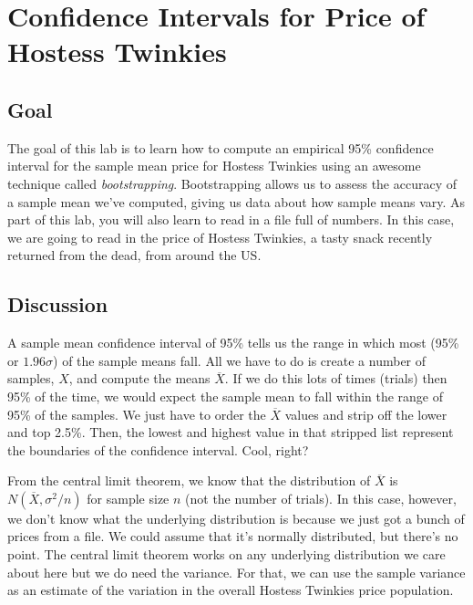 \chapter{Confidence Intervals for Price of Hostess Twinkies}

\setcounter{problem}{1}
\section{Goal}

\begin{fullwidth}


The goal of this lab is to learn how to compute an empirical 95\% confidence interval for the sample mean price for Hostess Twinkies using an awesome technique called {\em bootstrapping}. Bootstrapping allows us to assess the accuracy of a sample mean we've computed, giving us data about how sample means vary. As part of this lab, you will also learn to read in a file full of numbers. In this case, we are going to read in the price of Hostess Twinkies, a tasty snack recently returned from the dead, from around the US.

\section{Discussion}

A sample mean confidence interval of 95\% tells us the range in which most (95\% or $1.96\sigma$) of the sample means fall.  All we have to do is create a number of samples, $X$, and compute the means $\overline{X}$.  If we do this lots of times (trials) then 95\% of the time, we would expect the sample mean to fall within the range of 95\% of the samples. We just have to order the $\overline{X}$ values and strip off the lower and top 2.5\%. Then, the lowest and highest value in that stripped list represent the boundaries of the confidence interval. Cool, right?

From the central limit theorem, we know that the distribution of $\overline{X}$ is $N(\overline{X}, \sigma^2/n)$ for sample size $n$ (not the number of trials). In this case, however, we don't know what the underlying distribution is because we just got a bunch of prices from a file. We could assume that it's normally distributed, but there's no point. The central limit theorem works on any underlying distribution we care about here but we do need the variance. For that, we can use the sample variance as an estimate of the variation in the overall Hostess Twinkies price population.  


\end{fullwidth}
